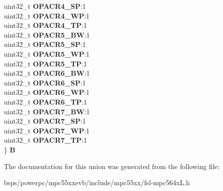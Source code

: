 \begin{DoxyCompactItemize}
\begin{tabbing}
\>uint32\_t {\bfseries OPACR4\_SP}:1\\
\>uint32\_t {\bfseries OPACR4\_WP}:1\\
\>uint32\_t {\bfseries OPACR4\_TP}:1\\
\>uint32\_t {\bfseries OPACR5\_BW}:1\\
\>uint32\_t {\bfseries OPACR5\_SP}:1\\
\>uint32\_t {\bfseries OPACR5\_WP}:1\\
\>uint32\_t {\bfseries OPACR5\_TP}:1\\
\>uint32\_t {\bfseries OPACR6\_BW}:1\\
\>uint32\_t {\bfseries OPACR6\_SP}:1\\
\>uint32\_t {\bfseries OPACR6\_WP}:1\\
\>uint32\_t {\bfseries OPACR6\_TP}:1\\
\>uint32\_t {\bfseries OPACR7\_BW}:1\\
\>uint32\_t {\bfseries OPACR7\_SP}:1\\
\>uint32\_t {\bfseries OPACR7\_WP}:1\\
\>uint32\_t {\bfseries OPACR7\_TP}:1\\
\} {\bfseries B}\\

\end{tabbing}\end{DoxyCompactItemize}


The documentation for this union was generated from the following file\+:\begin{DoxyCompactItemize}
\item 
bsps/powerpc/mpc55xxevb/include/mpc55xx/fsl-\/mpc564x\+L.\+h\end{DoxyCompactItemize}
